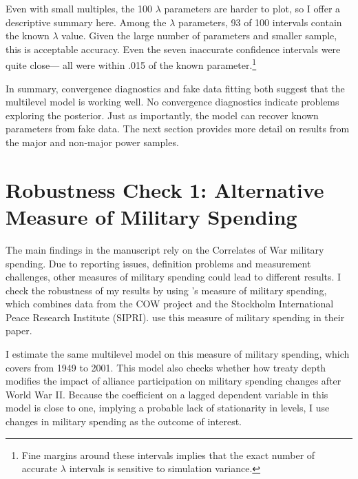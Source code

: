 \documentclass[12pt]{article}
\begin{document}
 
Even with small multiples, the 100 $\lambda$ parameters are harder to plot, so I offer a descriptive summary here. 
Among the $\lambda$ parameters, 93 of 100 intervals contain the known $\lambda$ value.
Given the large number of parameters and smaller sample, this is acceptable accuracy. 
Even the seven inaccurate confidence intervals were quite close--- all were within .015 of the known parameter.\footnote{Fine margins around these intervals implies that the exact number of accurate $\lambda$ intervals is sensitive to simulation variance.}


In summary, convergence diagnostics and fake data fitting both suggest that the multilevel model is working well. 
No convergence diagnostics indicate problems exploring the posterior. 
Just as importantly, the model can recover known parameters from fake data. 
The next section provides more detail on results from the major and non-major power samples. 




\section*{Robustness Check 1: Alternative Measure of Military Spending}

The main findings in the manuscript rely on the Correlates of War military spending. 
Due to reporting issues, definition problems and measurement challenges, other measures of military spending could lead to different results. 
I check the robustness of my results by using \citet{Nordhausetal2012}'s measure of military spending, which combines data from the COW project and the Stockholm International Peace Research Institute (SIPRI). 
\citet{DigiuseppePoast2016} use this measure of military spending in their paper. 


I estimate the same multilevel model on this measure of military spending, which covers from 1949 to 2001. 
This model also checks whether how treaty depth modifies the impact of alliance participation on military spending changes after World War II.
Because the coefficient on a lagged dependent variable in this model is close to one, implying a probable lack of stationarity in levels, I use changes in military spending as the outcome of interest. 
\end{document}
